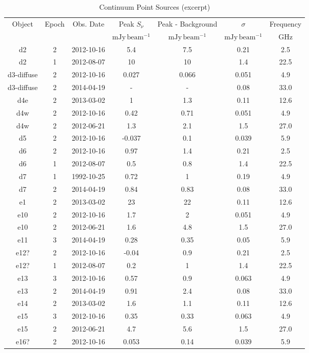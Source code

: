 \begin{table*}[htp]
\caption{Continuum Point Sources (excerpt)}
\begin{tabular}{ccccccc}
\label{tab:contsrcs}
Object & Epoch & Obs. Date & Peak $S_{\nu}$ & Peak - Background & $\sigma$ & Frequency \\
 &  &  & $\mathrm{mJy\,beam^{-1}}$ & $\mathrm{mJy\,beam^{-1}}$ & $\mathrm{mJy\,beam^{-1}}$ & $\mathrm{GHz}$ \\
\hline
d2 & 2 & 2012-10-16 & 5.4 & 7.5 & 0.21 & 2.5 \\
d2 & 1 & 2012-08-07 & 10 & 10 & 1.4 & 22.5 \\
d3-diffuse & 2 & 2012-10-16 & 0.027 & 0.066 & 0.051 & 4.9 \\
d3-diffuse & 2 & 2014-04-19 & - & - & 0.08 & 33.0 \\
d4e & 2 & 2013-03-02 & 1 & 1.3 & 0.11 & 12.6 \\
d4w & 2 & 2012-10-16 & 0.42 & 0.71 & 0.051 & 4.9 \\
d4w & 2 & 2012-06-21 & 1.3 & 2.1 & 1.5 & 27.0 \\
d5 & 2 & 2012-10-16 & -0.037 & 0.1 & 0.039 & 5.9 \\
d6 & 2 & 2012-10-16 & 0.97 & 1.4 & 0.21 & 2.5 \\
d6 & 1 & 2012-08-07 & 0.5 & 0.8 & 1.4 & 22.5 \\
d7 & 1 & 1992-10-25 & 0.72 & 1 & 0.19 & 4.9 \\
d7 & 2 & 2014-04-19 & 0.84 & 0.83 & 0.08 & 33.0 \\
e1 & 2 & 2013-03-02 & 23 & 22 & 0.11 & 12.6 \\
e10 & 2 & 2012-10-16 & 1.7 & 2 & 0.051 & 4.9 \\
e10 & 2 & 2012-06-21 & 1.6 & 4.8 & 1.5 & 27.0 \\
e11 & 3 & 2014-04-19 & 0.28 & 0.35 & 0.05 & 5.9 \\
e12? & 2 & 2012-10-16 & -0.04 & 0.9 & 0.21 & 2.5 \\
e12? & 1 & 2012-08-07 & 0.2 & 1 & 1.4 & 22.5 \\
e13 & 3 & 2012-10-16 & 0.57 & 0.9 & 0.063 & 4.9 \\
e13 & 2 & 2014-04-19 & 0.91 & 2.4 & 0.08 & 33.0 \\
e14 & 2 & 2013-03-02 & 1.6 & 1.1 & 0.11 & 12.6 \\
e15 & 3 & 2012-10-16 & 0.35 & 0.33 & 0.063 & 4.9 \\
e15 & 2 & 2012-06-21 & 4.7 & 5.6 & 1.5 & 27.0 \\
e16? & 2 & 2012-10-16 & 0.053 & 0.14 & 0.039 & 5.9 \\

\end{tabular}
\end{table*}
